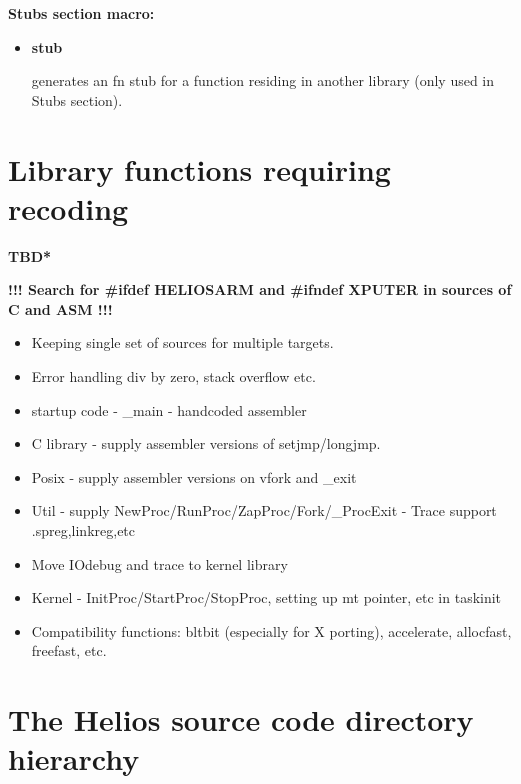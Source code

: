 {\bf Stubs section macro:}
\vspace{0.25cm}
\begin{itemize}

\item {\bf stub} 

generates an fn stub for a function residing in another library
(only used in Stubs section).
\end{itemize}

\section{Library functions requiring recoding}
{\bf *TBD*}

{\bf !!! Search for \#ifdef HELIOSARM and \#ifndef XPUTER in sources of C 
and ASM !!!}

\begin{itemize}
\item Keeping single set of sources for multiple targets.
\item Error handling div by zero, stack overflow etc.
\item startup code - \_main - handcoded assembler
\item C library - supply assembler versions of setjmp/longjmp.
\item Posix - supply assembler versions on vfork and \_exit
\item Util - supply NewProc/RunProc/ZapProc/Fork/\_ProcExit - Trace support \newline
.spreg,linkreg,etc
\item Move IOdebug and trace to kernel library
\item Kernel - InitProc/StartProc/StopProc, setting up mt pointer, etc in taskinit
\item Compatibility functions: bltbit (especially for X porting), accelerate,
allocfast, freefast, etc.
\end{itemize}

\section{The Helios source code directory hierarchy}

